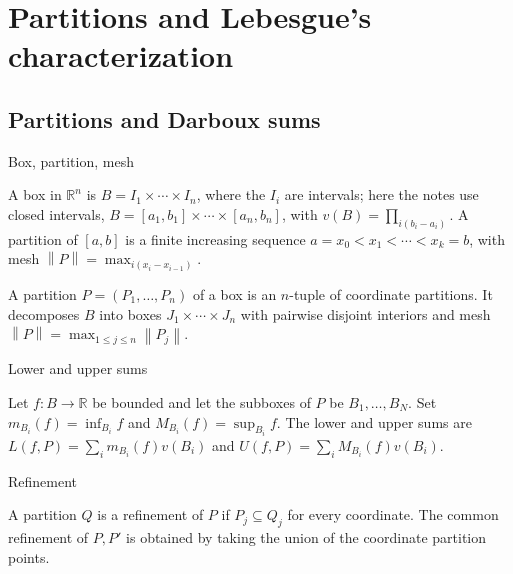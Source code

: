 \chapter{Partitions and Lebesgue's characterization}

\section{Partitions and Darboux sums}

\begin{definition}{Box, partition, mesh}

A box in \(\mathbb{R}^{n}\) is \(B = I_{1} \times \cdots \times I_{n}\), where the \(I_{i}\) are intervals; here the notes use closed intervals, \(B = \left\lbrack {a_{1},b_{1}} \right\rbrack \times \cdots \times \left\lbrack {a_{n},b_{n}} \right\rbrack\), with \(v(B) = \prod_{i{({b_{i} - a_{i}})}}\). A partition of \(\left\lbrack {a,b} \right\rbrack\) is a finite increasing sequence \(a = x_{0} < x_{1} < \cdots < x_{k} = b\), with mesh \(\left\| P \right\| = \max_{i{({x_{i} - x_{i - 1}})}}\).

A partition \(P = \left( {P_{1},\ldots,P_{n}} \right)\) of a box is an \(n\)-tuple of coordinate partitions. It decomposes \(B\) into boxes \(J_{1} \times \cdots \times J_{n}\) with pairwise disjoint interiors and mesh \(\left\| P \right\| = \max_{1 \leq j \leq n}\left\| P_{j} \right\|\).

\end{definition}

\begin{definition}{Lower and upper sums}

Let \(f:B\rightarrow\mathbb{R}\) be bounded and let the subboxes of \(P\) be \(B_{1},\ldots,B_{N}\). Set \(m_{B_{i}}(f) = \inf_{B_{i}}f\) and \(M_{B_{i}}(f) = \sup_{B_{i}}f\). The lower and upper sums are \(L\left( {f,P} \right) = \sum_{i}m_{B_{i}}(f)v\left( B_{i} \right)\) and \(U\left( {f,P} \right) = \sum_{i}M_{B_{i}}(f)v\left( B_{i} \right)\).

\end{definition}

\begin{definition}{Refinement}

A partition \(Q\) is a refinement of \(P\) if \(P_{j} \subseteq Q_{j}\) for every coordinate. The common refinement of \(P,P'\) is obtained by taking the union of the coordinate partition points.

\end{definition}

